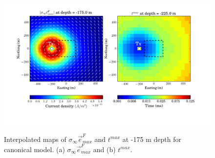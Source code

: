 \documentclass[a4paper, 11pt]{article}
\newcommand{\siginf}{\sigma_\infty}
\newcommand {\e}  { {\vec e} }
\begin{document}
\begin{figure}[htb]
  \centering
  \includegraphics[height=0.4\textheight]{figures/synthetic/JmaxTmaxCase1_plan.png} \\
  \caption{Interpolated maps of $\siginf\e^F_{max}$ and $t^{max}$ at -175 m depth for canonical model. (a) $\siginf\e^F_{max}$ and (b) $t^{max}$.}
  \label{F: JmaxTmaxCase1_plan}
\end{figure}
\end{document}
